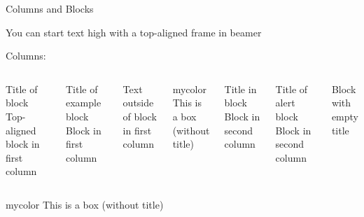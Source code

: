 \documentclass[aspectratio=169,t]{beamer}  %
\begin{document}
\begin{frame}{Columns and Blocks}


You can start text high with a top-aligned frame in beamer

Columns:
  \begin{columns}
      \begin{block}{Title of block}
        Top-aligned block in first column
      \end{block}
      \begin{example}{Title of example block}
        Block in first column
      \end{example}
      Text outside of block in first column
      \vspace{1ex}
      
      \begin{beamercolorbox}[wd=\linewidth, colsep*=4pt]{mycolor}
         This is a box (without title)
       \end{beamercolorbox}
       
      \begin{block}{Title in block}
        Block in second column 
      \end{block}
      \begin{alertblock}{Title of alert block}
        Block in second column
      \end{alertblock}
      \begin{block}{}
        Block with empty title
      \end{block}
    \end{columns}
    
    \vspace{1ex}
    \begin{beamercolorbox}[wd=\linewidth, colsep*=4pt]{mycolor}
      This is a box (without title)
    \end{beamercolorbox}
 \end{frame}
 
\end{document}
